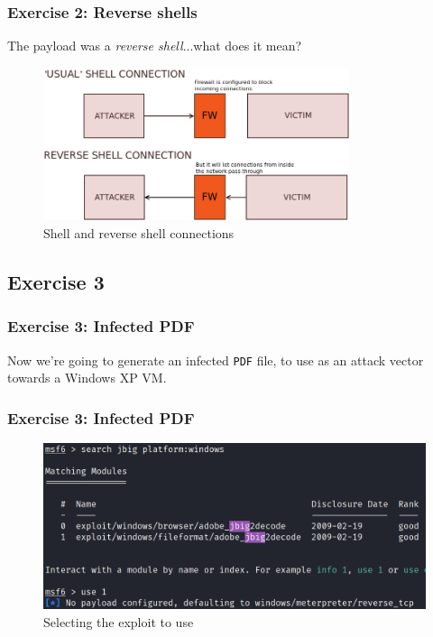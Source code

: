 \documentclass[handout]{beamer}
\begin{document}
\begin{frame}
	\frametitle{Exercise 2: Reverse shells}
    The payload was a \emph{reverse shell}...what does it mean?
	\begin{figure}
	    \centering
        \includegraphics[width=0.8\textwidth]{../drawable/decorations/schema_reverse_shell.png}
	    \caption{Shell and reverse shell connections}
	\end{figure}
\end{frame}

\subsection{Exercise 3}

\begin{frame}
	\frametitle{Exercise 3: Infected PDF}
	Now we're going to generate an infected \texttt{PDF} file, to use as an attack vector towards a Windows XP VM.
\end{frame}

\begin{frame}
    \frametitle{Exercise 3: Infected PDF}
    \begin{figure}
        \centering
        \includegraphics[width=\textwidth]{../drawable/exercise_3_screenshots/module_selection.png}
        \caption{Selecting the exploit to use}
    \end{figure}
\end{frame}
\end{document}
